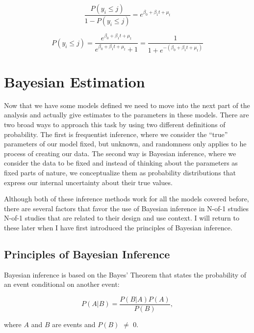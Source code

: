 \documentclass[12pt,a4paper,leqno]{report}
\theoremstyle{plain}
\theoremstyle{definition}
\theoremstyle{remark}
\begin{document}
\begin{def}\label{}
\begin{equation}\label{ord_exponentiating}
\frac{P(y_i \leq j)}{1 - P(y_i \leq j)}=e^{\beta_0 + \beta_1 t + \mu_t}
\end{equation}
\end{def}

\begin{def}\label{}
\begin{equation}\label{ord_algmanipulation}
P(y_i \leq j)=\frac{e^{\beta_0 + \beta_1 t + \mu_t}}{e^{\beta_0 + \beta_1 t + \mu_t}+1}=\frac{1}{1+e^{-(\beta_0 + \beta_1 t + \mu_t)}}
\end{equation}
\end{def}

\chapter{Bayesian Estimation}\label{bayes}

Now that we have some models defined we need to move into the next part of the
analysis and actually give estimates to the parameters in these models. There are two
broad ways to approach this task by using two different definitions of probability.
The first is frequentist inference, where we consider the ``true'' parameters of our model fixed,
but unknown, and randomness only applies to he process of creating our data.
The second way is Bayesian inference, where we consider the data to be fixed and instead of thinking
about the parameters as fixed parts of nature, we conceptualize them as probability distributions
that express our internal uncertainty about their true values.

Although both of these inference methods work for all the models covered before,
there are several factors that favor the use of
Bayesian inference in N-of-1 studies N-of-1 studies that are related to their design and use context.
I will return to these later when I have first introduced the principles of Bayesian inference.

\section{Principles of Bayesian Inference}\label{whybayes}

Bayesian inference is based on the Bayes' Theorem that states the probability of an event
conditional on another event:

\begin{def}\label{bayesrule}
\begin{equation}
P(A|B) = \frac{P(B|A)P(A)}{P(B)},
\end{equation}
\end{def}where \(A\) and \(B\) are events and \(P(B)\) \(\neq \) 0.
\end{document}
